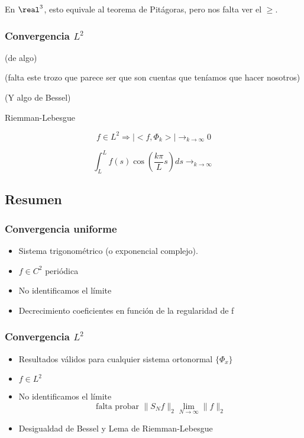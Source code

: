 			\obs En $\real^3$, esto equivale al teorema de Pitágoras, pero nos falta ver el $\geq$.


		\subsubsection{Convergencia $L^2$} (de algo)

			(falta este trozo que parece ser que son cuentas que teníamos que hacer nosotros)

			(Y algo de Bessel)


			\begin{lemma}{Riemman-Lebesgue}

				\[ f \in L^2 \Rightarrow |<f, \Phi_k>| \rightarrow_{k \to \infty} 0\]

				\[\int^{L}_{L} f(s) \cos \left( \frac{k \pi}{L} s \right) ds \rightarrow_{k \to \infty}  \]

			\end{lemma}

	\subsection{Resumen}


		\subsubsection*{Convergencia uniforme}

			\begin{itemize}
				\item Sistema trigonométrico (o exponencial complejo).
				\item $f \in C^2$ periódica
				\item No identificamos el límite
				\item Decrecimiento coeficientes en función de la regularidad de f
			\end{itemize}

		\subsubsection*{Convergencia $L^2$}

			\begin{itemize}
				\item Resultados válidos para cualquier sistema ortonormal $\{ \Phi_x \}$
				\item $f \in L^2$
				\item No identificamos el límite
				\[\text{falta probar }\|S_N f\|_2 \lim_{N \to \infty} \|f\|_2\]
				\item Desigualdad de Bessel y Lema de Riemman-Lebesgue

			\end{itemize}

